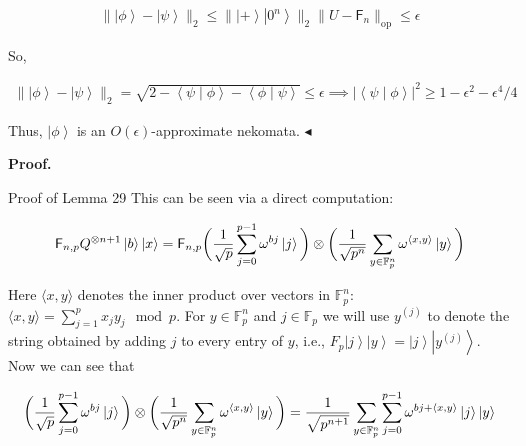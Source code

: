 \documentclass[10pt,a4paper]{article}
\begin{document}
\[\begin{gathered}
\displaystyle\|\left|\phi\right\rangle-\left|\psi\right\rangle\|_{2}\leq\|\left|+\right\rangle\left|0^{n}\right\rangle\|_{2}\|U-\mathsf{F}_{n}\|_{\mathrm{op}}\leq\epsilon
\end{gathered}\]


So,\par


\[\begin{gathered}
\displaystyle\|\left|\phi\right\rangle-\left|\psi\right\rangle\|_{2} \displaystyle=\sqrt{2-\left\langle\psi\middle|\phi\right\rangle-\left\langle\phi\middle|\psi\right\rangle}\leq\epsilon\implies|\left\langle\psi\middle|\phi\right\rangle|^{2}\geq 1-\epsilon^{2}-\epsilon^{4}/4
\end{gathered}\]


Thus, $\left|\phi\right\rangle$ is an $O(\epsilon)$-approximate nekomata.
$\blacktriangleleft$\par





\par\medskip\noindent\textbf{Proof.}\par




Proof of Lemma 29
This can be seen via a direct computation:\par


\[\begin{gathered}
\displaystyle\mathsf{F}_{n,p}Q^{\otimes{n+1}}\left|b\right\rangle\left|x\right\rangle \displaystyle=\mathsf{F}_{n,p}\bigg{(}\frac{1}{\sqrt{p}}\sum_{j=0}^{p-1}\omega^{bj}\left|j\right\rangle\bigg{)}\otimes\bigg{(}\frac{1}{\sqrt{p^{n}}}\sum_{y\in\mathbb{F}_{p}^{n}}\omega^{\langle x,y\rangle}\left|y\right\rangle\bigg{)}
\end{gathered}\]


Here $\langle x,y\rangle$ denotes the inner product over vectors in $\mathbb{F}_{p}^{n}$: $\langle x,y\rangle=\sum_{j=1}^{p}x_{j}y_{j}\mod{p}$. For $y\in\mathbb{F}_{p}^{n}$ and $j\in\mathbb{F}_{p}$ we will use $y^{(j)}$ to denote the string obtained by adding $j$ to every entry of $y$, i.e., $F_{p}\left|j\right\rangle\left|y\right\rangle=\left|j\right\rangle\left|y^{(j)}\right\rangle$. Now we can see that\par


\[\begin{gathered}
\displaystyle\bigg{(}\frac{1}{\sqrt{p}}\sum_{j=0}^{p-1}\omega^{bj}\left|j\right\rangle\bigg{)}\otimes\bigg{(}\frac{1}{\sqrt{p^{n}}}\sum_{y\in\mathbb{F}_{p}^{n}}\omega^{\langle x,y\rangle}\left|y\right\rangle\bigg{)}=\frac{1}{\sqrt{p^{n+1}}}\sum_{y\in\mathbb{F}_{p}^{n}}\sum_{j=0}^{p-1}\omega^{bj+\langle
x,y\rangle}\left|j\right\rangle\left|y\right\rangle
\end{gathered}\]
\end{document}
